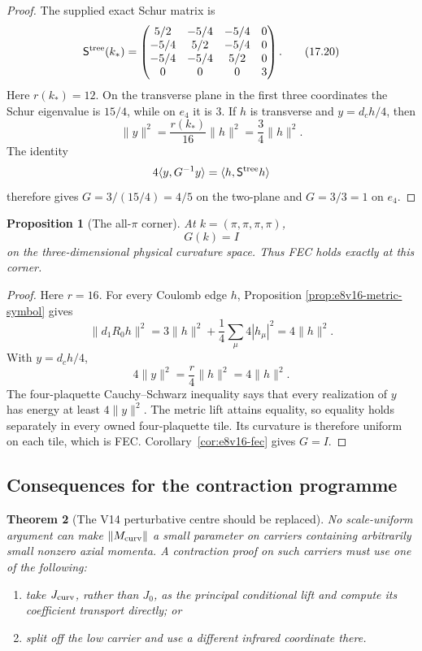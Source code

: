 \documentclass[11pt,oneside]{book}
\newtheorem{theorem}{Theorem}[chapter]
\newtheorem{proposition}[theorem]{Proposition}
\theoremstyle{definition}
\theoremstyle{remark}
\begin{document}
\begin{proof}
The supplied exact Schur matrix is
\[
\mathsf S^{\rm tree}(k_*)=
\begin{pmatrix}
5/2&-5/4&-5/4&0\\
-5/4&5/2&-5/4&0\\
-5/4&-5/4&5/2&0\\
0&0&0&3
\end{pmatrix}.                                      \tag{17.20}
\]
Here \(r(k_*)=12\).  On the transverse plane in the first three
coordinates the Schur eigenvalue is \(15/4\), while on \(e_4\) it is
\(3\).  If \(h\) is transverse and \(y=d_ch/4\), then
\[
 \|y\|^2=\frac{r(k_*)}{16}\|h\|^2=\frac34\|h\|^2.
\]
The identity
\[
 4\langle y,G^{-1}y\rangle
 =\langle h,\mathsf S^{\rm tree}h\rangle
\]
therefore gives \(G=3/(15/4)=4/5\) on the two-plane and
\(G=3/3=1\) on \(e_4\).
\end{proof}

\begin{proposition}[The all-\(\pi\) corner]
\label{prop:e8v17-all-pi}
At \(k=(\pi,\pi,\pi,\pi)\),
\[
                              G(k)=I
\]
on the three-dimensional physical curvature space.  Thus FEC holds
exactly at this corner.
\end{proposition}

\begin{proof}
Here \(r=16\).  For every Coulomb edge \(h\), Proposition
\ref{prop:e8v16-metric-symbol} gives
\[
 \|d_1R_0h\|^2
 =3\|h\|^2+\frac14\sum_\mu4|h_\mu|^2
 =4\|h\|^2.
\]
With \(y=d_ch/4\),
\[
 4\|y\|^2=\frac r4\|h\|^2=4\|h\|^2.
\]
The four-plaquette Cauchy--Schwarz inequality says that every
realization of \(y\) has energy at least \(4\|y\|^2\).  The metric
lift attains equality, so equality holds separately in every owned
four-plaquette tile.  Its curvature is therefore uniform on each
tile, which is FEC.  Corollary~\ref{cor:e8v16-fec} gives \(G=I\).
\end{proof}

\subsection{Consequences for the contraction programme}

\begin{theorem}[The V14 perturbative centre should be replaced]
\label{thm:e8v17-recenter}
No scale-uniform argument can make
\(\|M_{\rm curv}\|\) a small parameter on carriers containing
arbitrarily small nonzero axial momenta.  A contraction proof on such
carriers must use one of the following:
\begin{enumerate}
\item take \(J_{\rm curv}\), rather than \(J_0\), as the principal
conditional lift and compute its coefficient transport directly; or
\item split off the low carrier and use a different infrared
coordinate there.
\end{enumerate}
\end{theorem}
\end{document}
